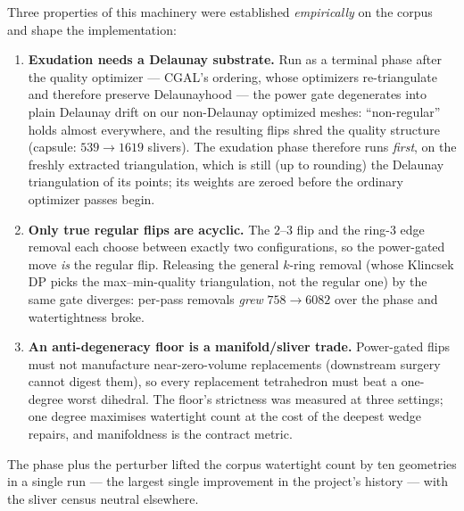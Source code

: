 \documentclass[11pt,a4paper]{article}
\numberwithin{equation}{section}
\begin{document}
\medskip\noindent
Three properties of this machinery were established \emph{empirically} on the
corpus and shape the implementation:
\begin{enumerate}
\item\textbf{Exudation needs a Delaunay substrate.} Run as a terminal phase
      after the quality optimizer --- CGAL's ordering, whose optimizers
      re-triangulate and therefore preserve Delaunayhood --- the power gate
      degenerates into plain Delaunay drift on our non-Delaunay optimized
      meshes: ``non-regular'' holds almost everywhere, and the resulting flips
      shred the quality structure (capsule: $539\to1619$ slivers). The
      exudation phase therefore runs \emph{first}, on the freshly extracted
      triangulation, which is still (up to rounding) the Delaunay
      triangulation of its points; its weights are zeroed before the ordinary
      optimizer passes begin.
\item\textbf{Only true regular flips are acyclic.} The $2$--$3$ flip and the
      ring-$3$ edge removal each choose between exactly two configurations, so
      the power-gated move \emph{is} the regular flip. Releasing the general
      $k$-ring removal (whose Klincsek DP picks the max--min-quality
      triangulation, not the regular one) by the same gate diverges: per-pass
      removals \emph{grew} $758\to6082$ over the phase and watertightness
      broke.
\item\textbf{An anti-degeneracy floor is a manifold/sliver trade.} Power-gated
      flips must not manufacture near-zero-volume replacements (downstream
      surgery cannot digest them), so every replacement tetrahedron must beat
      a one-degree worst dihedral. The floor's strictness was measured at
      three settings; one degree maximises watertight count at the cost of the
      deepest wedge repairs, and manifoldness is the contract metric.
\end{enumerate}
The phase plus the perturber lifted the corpus watertight count by ten
geometries in a single run --- the largest single improvement in the project's
history --- with the sliver census neutral elsewhere.

\end{document}
